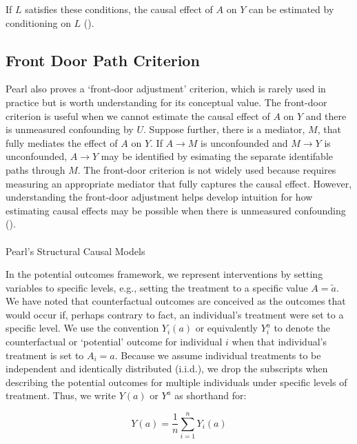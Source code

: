 \documentclass[
  single column]{article}
\makeatletter
\let\oldparagraph\paragraph
\renewcommand{\paragraph}{
    \@ifstar
      \xxxParagraphStar
      \xxxParagraphNoStar
  }
\newcommand{\xxxParagraphStar}[1]{\oldparagraph*{#1}\mbox{}}
\newcommand{\xxxParagraphNoStar}[1]{\oldparagraph{#1}\mbox{}}
\makeatother
\begin{document}
If \(L\) satisfies these conditions, the causal effect of \(A\) on \(Y\)
can be estimated by conditioning on \(\boxed{L}\)
().

\subsection{Front Door Path Criterion}\label{front-door-path-criterion}

Pearl also proves a `front-door adjustment' criterion, which is rarely
used in practice but is worth understanding for its conceptual value.
The front-door criterion is useful when we cannot estimate the causal
effect of \(A\) on \(Y\) and there is unmeasured confounding by \(U\).
Suppose further, there is a mediator, \(M\), that fully mediates the
effect of \(A\) on \(Y\). If \(A\to M\) is unconfounded and \(M \to Y\)
is unconfounded, \(A \to Y\) may be identified by esimating the separate
identifable paths through \(M\). The front-door criterion is not widely
used because requires measuring an appropriate mediator that fully
captures the causal effect. However, understanding the front-door
adjustment helps develop intuition for how estimating causal effects may
be possible when there is unmeasured confounding
().

\paragraph{Pearl's Structural Causal
Models}\label{pearls-structural-causal-models}

In the potential outcomes framework, we represent interventions by
setting variables to specific levels, e.g., setting the treatment to a
specific value \(A = \tilde{a}\). We have noted that counterfactual
outcomes are conceived as the outcomes that would occur if, perhaps
contrary to fact, an individual's treatment were set to a specific
level. We use the convention \(Y_i(a)\) or equivalently \(Y_i^{a}\) to
denote the counterfactual or `potential' outcome for individual \(i\)
when that individual's treatment is set to \(A_i = a\). Because we
assume individual treatments to be independent and identically
distributed (i.i.d.), we drop the subscripts when describing the
potential outcomes for multiple individuals under specific levels of
treatment. Thus, we write \(Y(a)\) or \(Y^a\) as shorthand for:

\[
Y(a) = \frac{1}{n} \sum_{i=1}^n Y_i(a)
\]
\end{document}
